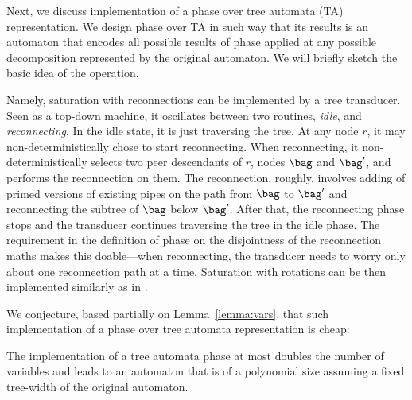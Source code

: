 {%
%
%
Next, we discuss implementation of a phase
over tree automata (TA) representation.
We design phase over TA in such way that its results is an automaton that encodes all possible results of phase applied at any possible decomposition represented by the original automaton.
%
We will briefly sketch the basic idea of the operation. %

Namely, saturation with reconnections can be implemented by a tree transducer.
Seen as a top-down machine, it oscillates between two routines, \emph{idle},  and \emph{reconnecting}.
In the idle state, it is just traversing the tree. At any node $r$, it may non-deterministically chose to start reconnecting. 
When reconnecting, it non-deterministically selects two peer descendants of $r$, nodes $\bag$ and $\bag'$, and performs the reconnection on them. 
The reconnection, roughly, involves adding of primed versions of existing pipes on the path from $\bag$ to $\bag'$ and reconnecting the subtree of $\bag$ below $\bag'$. 
After that, the reconnecting phase stops and the transducer continues traversing the tree in the idle phase. The requirement in the definition of phase on the disjointness of the reconnection maths makes this doable---when reconnecting, the transducer needs to worry only about one reconnection path at a time.
Saturation with rotations can be then implemented similarly as in \cite{iosif_deciding_2014}.
%

We conjecture, based partially on Lemma~\ref{lemma:vars}, that such implementation of a phase over tree automata representation is cheap:
\begin{conjecture}
The implementation of a tree automata phase at most doubles the number of variables and leads to an automaton that is of a polynomial size assuming a fixed tree-width of the original automaton.
\end{conjecture}


}
